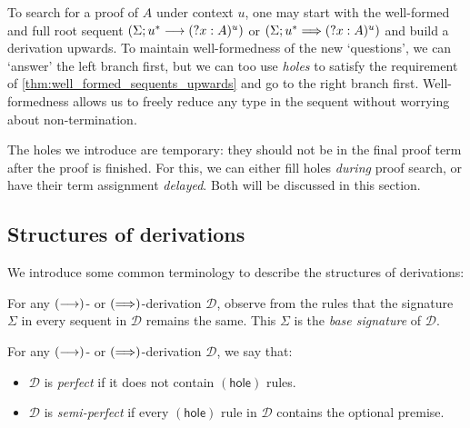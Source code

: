 \documentclass[twoside]{report}
\begin{document}
To search for a proof of $A$ under context $u$, one may start with the well-formed and full root sequent $(\Sigma; u^\ast \longrightarrow ({?x} : A)^u)$ or $(\Sigma; u^\ast \Longrightarrow ({?x} : A)^u)$ and build a derivation upwards. To maintain well-formedness of the new `questions', we can `answer' the left branch first, but we can too use \emph{holes} to satisfy the requirement of \cref{thm:well_formed_sequents_upwards} and go to the right branch first. Well-formedness allows us to freely reduce any type in the sequent without worrying about non-termination.

The holes we introduce are temporary: they should not be in the final proof term after the proof is finished. For this, we can either fill holes \emph{during} proof search, or have their term assignment \emph{delayed}. Both will be discussed in this section.

\subsection*{Structures of derivations}

We introduce some common terminology to describe the structures of derivations:

\newcommand{\preserved}{\operatorname{pre}}
\newcommand{\principal}{\operatorname{pri}}
\newcommand{\constituent}{\operatorname{con}}

\begin{definition}
    \label{def:sequent_calculi_base_signatures}
    For any $(\longrightarrow)$- or $(\Longrightarrow)$-derivation $\mathcal D$, observe from the rules that the signature $\Sigma$ in every sequent in $\mathcal D$ remains the same. This $\Sigma$ is the \emph{base signature} of $\mathcal D$.
\end{definition}

\begin{definition}
    \label{def:sequent_calculi_classifications}
    For any $(\longrightarrow)$- or $(\Longrightarrow)$-derivation $\mathcal D$, we say that:
    \begin{itemize}[noitemsep]
        \item $\mathcal D$ is \emph{perfect} if it does not contain $(\mathsf{hole})$ rules.
        \item $\mathcal D$ is \emph{semi-perfect} if every $(\mathsf{hole})$ rule in $\mathcal D$ contains the optional premise.
    \end{itemize}
\end{definition}
\end{document}
